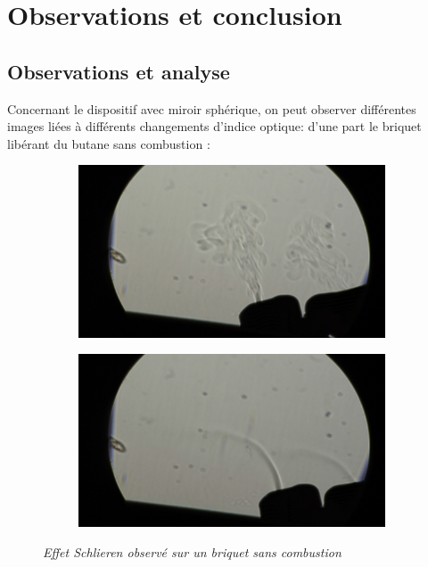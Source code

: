 \section{Observations et conclusion}
\subsection{Observations et analyse}
Concernant le dispositif avec miroir sphérique, on peut observer différentes images liées à différents changements d’indice optique: d’une part le briquet libérant du butane sans combustion :\\
\begin{figure}[H]
	\centering
	\begin{subfigure}[t]{0.49\textwidth}
		\centering
		\includegraphics[scale=0.17]{figures/sans_combustion1.jpg}
		\label{fig:sans_combustion1}
	\end{subfigure}%
	\begin{subfigure}[t]{0.49\textwidth}
		\centering
		\includegraphics[scale=0.17]{figures/sans_combustion2.jpg}
		\label{fig:sans_combustion2}
	\end{subfigure}
	\caption{\small{\textit{Effet Schlieren observé sur un briquet sans combustion}}}
	\label{fig:briquet}
\end{figure}
